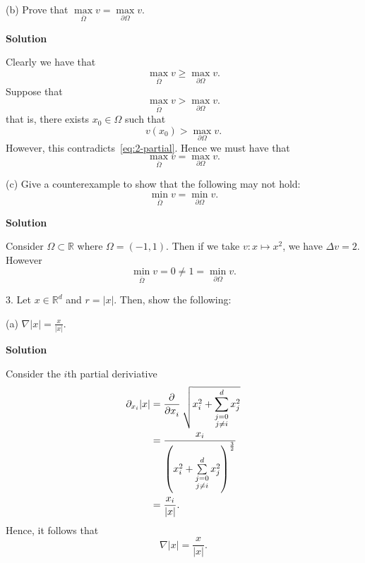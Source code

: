 \documentclass{article}
\begin{document}
(b) Prove that $\max\limits_{\bar{\Omega}} v = \max\limits_{\partial \Omega} v$.

\textbf{Solution}

Clearly we have that
%
\begin{equation*}
    \max_{\bar{\Omega}} v \geq \max_{\partial \Omega} v
    .
\end{equation*}
%
Suppose that
%
\begin{equation*}
    \max_{\bar{\Omega}} v > \max_{\partial \Omega} v
    .
\end{equation*}
%
that is, there exists $x_0 \in \Omega$ such that
%
\begin{equation*}
    v(x_0) > \max_{\partial \Omega} v
    .
\end{equation*}
%
However, this contradicts~\eqref{eq:2-partial}. Hence we must have that
%
\begin{equation*}
    \max_{\bar{\Omega}} v = \max_{\partial \Omega} v
    .
\end{equation*}

\vspace{5mm}

(c) Give a counterexample to show that the following may not hold:
%
\begin{equation*}
    \min_{\bar \Omega} v = \min_{\partial\Omega} v
    .
\end{equation*}

\textbf{Solution}

Consider $\Omega \subset \mathbb{R}$ where $\Omega = (-1, 1)$. Then if
we take $v: x \mapsto x^2$, we have $\Delta v = 2$. However
%
\begin{equation*}
    \min_{\bar \Omega} v = 0 \neq 1 = \min_{\partial\Omega} v
    .
\end{equation*}

\newpage

3. Let $x \in \mathbb{R}^d$ and $r = |x|$. Then, show the following:

(a) $\nabla |x| = \frac{x}{|x|}$.

\textbf{Solution}

Consider the $i$th partial deriviative
%
\begin{align*}
    \partial_{x_i} |x|
        &= \dpd{}{x_i} \sqrt{x_i^2 + \sum_{\substack{j = 0 \\ j \neq i}}^d x_j^2} \\
        &= \frac{x_i}{\del{x_i^2 + \sum\limits_{\substack{j = 0 \\ j \neq i}}^d x_j^2}^\frac{3}{2}} \\
        &= \frac{x_i}{|x|}
        .
\end{align*}
%
Hence, it follows that \[\nabla |x| = \frac{x}{|x|}.\]
\end{document}
